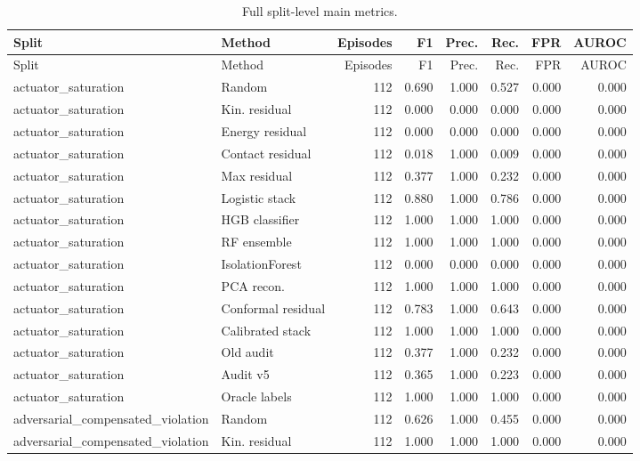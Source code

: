 {\scriptsize
\setlength{\tabcolsep}{2.5pt}
\begin{longtable}{llrrrrrr}
\caption{Full split-level main metrics.}\label{tab:full-metrics}\\
\toprule
Split & Method & Episodes & F1 & Prec. & Rec. & FPR & AUROC \\
\midrule
\endfirsthead
\toprule
Split & Method & Episodes & F1 & Prec. & Rec. & FPR & AUROC \\
\midrule
\endhead
actuator\_saturation & Random & 112 & 0.690 & 1.000 & 0.527 & 0.000 & 0.000 \\
actuator\_saturation & Kin. residual & 112 & 0.000 & 0.000 & 0.000 & 0.000 & 0.000 \\
actuator\_saturation & Energy residual & 112 & 0.000 & 0.000 & 0.000 & 0.000 & 0.000 \\
actuator\_saturation & Contact residual & 112 & 0.018 & 1.000 & 0.009 & 0.000 & 0.000 \\
actuator\_saturation & Max residual & 112 & 0.377 & 1.000 & 0.232 & 0.000 & 0.000 \\
actuator\_saturation & Logistic stack & 112 & 0.880 & 1.000 & 0.786 & 0.000 & 0.000 \\
actuator\_saturation & HGB classifier & 112 & 1.000 & 1.000 & 1.000 & 0.000 & 0.000 \\
actuator\_saturation & RF ensemble & 112 & 1.000 & 1.000 & 1.000 & 0.000 & 0.000 \\
actuator\_saturation & IsolationForest & 112 & 0.000 & 0.000 & 0.000 & 0.000 & 0.000 \\
actuator\_saturation & PCA recon. & 112 & 1.000 & 1.000 & 1.000 & 0.000 & 0.000 \\
actuator\_saturation & Conformal residual & 112 & 0.783 & 1.000 & 0.643 & 0.000 & 0.000 \\
actuator\_saturation & Calibrated stack & 112 & 1.000 & 1.000 & 1.000 & 0.000 & 0.000 \\
actuator\_saturation & Old audit & 112 & 0.377 & 1.000 & 0.232 & 0.000 & 0.000 \\
actuator\_saturation & Audit v5 & 112 & 0.365 & 1.000 & 0.223 & 0.000 & 0.000 \\
actuator\_saturation & Oracle labels & 112 & 1.000 & 1.000 & 1.000 & 0.000 & 0.000 \\
adversarial\_compensated\_violation & Random & 112 & 0.626 & 1.000 & 0.455 & 0.000 & 0.000 \\
adversarial\_compensated\_violation & Kin. residual & 112 & 1.000 & 1.000 & 1.000 & 0.000 & 0.000 \\

\end{longtable}}
